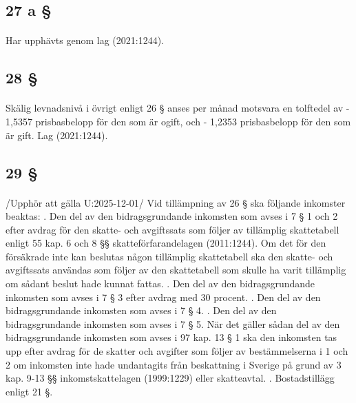 \documentclass[a4paper,notitlepage,openany,10pt]{book}
\begin{document}
\subsection*{27 a §}
\paragraph*{}
Har upphävts genom
lag (2021:1244).
\subsection*{28 §}
\paragraph*{}
Skälig levnadsnivå i övrigt enligt 26 § anses per månad motsvara en tolftedel av
\newline - 1,5357 prisbasbelopp för den som är ogift, och
\newline - 1,2353 prisbasbelopp för den som är gift.
Lag (2021:1244).
\subsection*{29 §}
\paragraph*{}
/Upphör att gälla U:2025-12-01/
Vid tillämpning av 26 § ska följande inkomster beaktas:
. Den del av den bidragsgrundande inkomsten som avses i 7 § 1 och 2 efter avdrag för den skatte- och avgiftssats som följer av tillämplig skattetabell enligt 55 kap. 6 och 8 §§ skatteförfarandelagen (2011:1244). Om det för den försäkrade inte kan beslutas någon tillämplig skattetabell ska den skatte- och avgiftssats användas som följer av den skattetabell som skulle ha varit tillämplig om sådant beslut hade kunnat fattas.
. Den del av den bidragsgrundande inkomsten som avses i 7 § 3 efter avdrag med 30 procent.
. Den del av den bidragsgrundande inkomsten som avses i 7 § 4.
. Den del av den bidragsgrundande inkomsten som avses i 7 § 5. När det gäller sådan del av den bidragsgrundande inkomsten som avses i 97 kap. 13 § 1 ska den inkomsten tas upp efter avdrag för de skatter och avgifter som följer av bestämmelserna i 1 och 2 om inkomsten inte hade undantagits från beskattning i Sverige på grund av 3 kap. 9-13 §§ inkomstskattelagen (1999:1229) eller skatteavtal.
. Bostadstillägg enligt 21 §.
\end{document}
